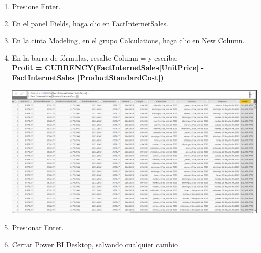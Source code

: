 \begin{enumerate}[1.]
    \item Presione Enter.
    \item En el panel Fields, haga clic en FactInternetSales.
    \item En la cinta Modeling, en el grupo Calculations, haga clic en New Column.
    \item En la barra de fórmulas, resalte Column = y escriba: \\

\textbf{Profit = CURRENCY(FactInternetSales[UnitPrice] - \\
FactInternetSales [ProductStandardCost])}

	\begin{center}
	\includegraphics[width=18cm]{./Imagenes/power17}
	\end{center}	

    \item Presionar Enter.
    \item Cerrar Power BI Desktop, salvando cualquier cambio

\end{enumerate}